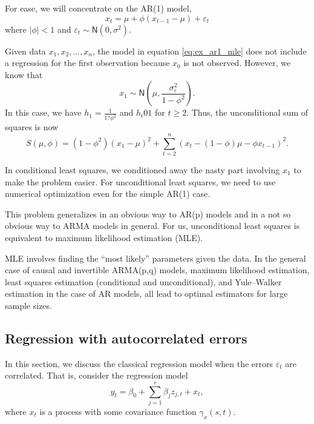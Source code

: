 \documentclass[
paper=128mm:96mm, %
fontsize=9.5pt, %
pagesize, %
parskip=half-, %
]{scrartcl} %
\def\qmo{``}
\def\qmcsp{'' }
\theoremstyle{mythmstyle} %
\def\qmo{``}
\def\qmcsp{'' }
\begin{document}
For ease, we will concentrate on the AR(1) model,
%
\begin{equation}
\label{eq:ex_ar1_mle}
x_t=\mu+\phi\left(x_{t-1}-\mu\right)+\varepsilon_t
\end{equation}
%
where $\vert\phi\vert<1$ and $\varepsilon_t\sim\mathsf{N}(0,\sigma^2)$.

Given data $x_1,x_2,\dots,x_n$, the model in equation \eqref{eq:ex_ar1_mle} does not include a regression for the first observation because $x_0$ is not observed. However, we know that
%
\begin{equation}
\label{eq:ex_ar1_mle}
x_1\sim\mathsf{N}\left(\mu,\frac{\sigma^2_\varepsilon}{1-\phi^2}\right).
\end{equation}
%
In this case, we have $h_1=\frac{1}{1?\phi^2}$ and $h_t01$ for $t\geq 2$. Thus, the unconditional sum of squares is now
%
\begin{equation}
S\left(\mu,\phi\right)=\left(1-\phi^2\right)\left(x_1-\mu\right)^2+\sum_{t=2}^n\left(x_t-(1-\phi)\mu-\phi x_{t-1}\right)^2.
\end{equation}
%
\clearpage


In conditional least squares, we conditioned away the nasty part involving $x_1$ to make the problem easier. For unconditional least squares, we need to use numerical optimization even for the simple AR(1) case.

This problem generalizes in an obvious way to AR(p) models and in a not so obvious way to ARMA models in general. For us, unconditional least squares is equivalent to maximum likelihood estimation (MLE). 

MLE involves finding the \qmo most likely\qmcsp parameters given the data. In the general case of causal and invertible ARMA(p,q) models, maximum likelihood estimation, least squares estimation (conditional and unconditional), and Yule--Walker estimation in the case of AR models, all lead to optimal estimators for large sample sizes.
\clearpage


\subsection{Regression with autocorrelated errors}
In this section, we discuss the classical regression model when the errors $\varepsilon_t$ are correlated. That is, consider the regression model
%
\begin{equation}
y_t=\beta_0+\sum_{j=1}^r\beta_jz_{j,t}+x_t,
\end{equation}
%
where $x_t$ is a process with some covariance function $\gamma_x(s,t)$. 
\end{document}
